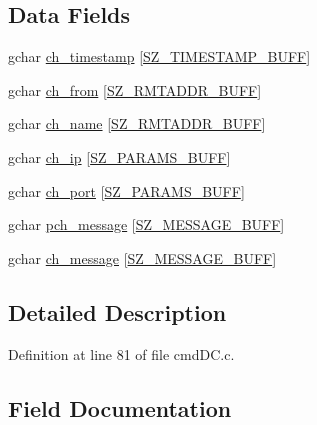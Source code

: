 \subsection*{Data Fields}
\begin{DoxyCompactItemize}
\item 
gchar \hyperlink{struct__registry_data_a362a4edf89daafe79565053dd70892c4}{ch\+\_\+timestamp} \mbox{[}\hyperlink{gtk_d_s_8c_ac08ad1b127f1c9743c5592ffb796423f}{S\+Z\+\_\+\+T\+I\+M\+E\+S\+T\+A\+M\+P\+\_\+\+B\+U\+FF}\mbox{]}
\item 
gchar \hyperlink{struct__registry_data_a5fac46820690525a9d8b3f0185bca587}{ch\+\_\+from} \mbox{[}\hyperlink{gtk_d_s_8c_a152ca8fa1a2eac39d1badafb6c6cef8c}{S\+Z\+\_\+\+R\+M\+T\+A\+D\+D\+R\+\_\+\+B\+U\+FF}\mbox{]}
\item 
gchar \hyperlink{struct__registry_data_a4764e2a72c3ba9177b6c4803cfa03f72}{ch\+\_\+name} \mbox{[}\hyperlink{gtk_d_s_8c_a152ca8fa1a2eac39d1badafb6c6cef8c}{S\+Z\+\_\+\+R\+M\+T\+A\+D\+D\+R\+\_\+\+B\+U\+FF}\mbox{]}
\item 
gchar \hyperlink{struct__registry_data_a814e064e77a6aac5866c88cb51acd971}{ch\+\_\+ip} \mbox{[}\hyperlink{gtk_d_s_8c_ac21e8a77d073e7a5383c92bb485992c8}{S\+Z\+\_\+\+P\+A\+R\+A\+M\+S\+\_\+\+B\+U\+FF}\mbox{]}
\item 
gchar \hyperlink{struct__registry_data_a74f03616af9ec9770266cb7988fe1a71}{ch\+\_\+port} \mbox{[}\hyperlink{gtk_d_s_8c_ac21e8a77d073e7a5383c92bb485992c8}{S\+Z\+\_\+\+P\+A\+R\+A\+M\+S\+\_\+\+B\+U\+FF}\mbox{]}
\item 
gchar \hyperlink{struct__registry_data_aad089cfecaeccff2c9c6bb7a97d46706}{pch\+\_\+message} \mbox{[}\hyperlink{gtk_d_s_8c_ab5903aa853c3769389e570c8490feb1e}{S\+Z\+\_\+\+M\+E\+S\+S\+A\+G\+E\+\_\+\+B\+U\+FF}\mbox{]}
\item 
gchar \hyperlink{struct__registry_data_ae9b0c1e6f13d980dcc7515def6b20b5e}{ch\+\_\+message} \mbox{[}\hyperlink{gtk_d_s_8c_ab5903aa853c3769389e570c8490feb1e}{S\+Z\+\_\+\+M\+E\+S\+S\+A\+G\+E\+\_\+\+B\+U\+FF}\mbox{]}
\end{DoxyCompactItemize}


\subsection{Detailed Description}


Definition at line 81 of file cmd\+D\+C.\+c.



\subsection{Field Documentation}
